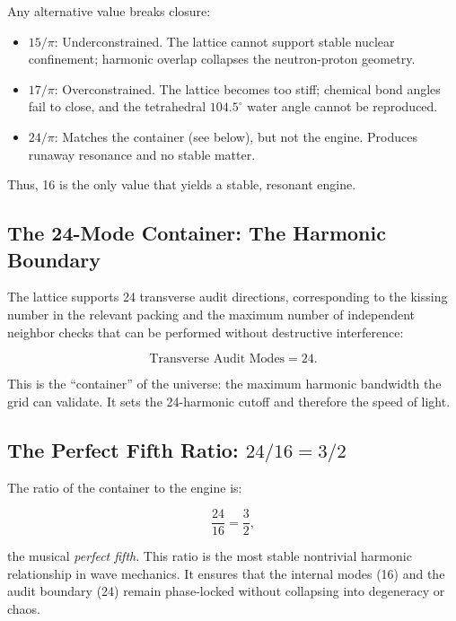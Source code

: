 \documentclass[12pt,oneside]{book}
\begin{document}
Any alternative value breaks closure:

\begin{itemize}
    \item \(15/\pi\): Underconstrained. The lattice cannot support stable nuclear
    confinement; harmonic overlap collapses the neutron-proton geometry.

    \item \(17/\pi\): Overconstrained. The lattice becomes too stiff; chemical bond
    angles fail to close, and the tetrahedral \(104.5^\circ\) water angle cannot be
    reproduced.

    \item \(24/\pi\): Matches the container (see below), but not the engine. Produces
    runaway resonance and no stable matter.
\end{itemize}

Thus, 16 is the only value that yields a stable, resonant engine.

\subsection{The 24-Mode Container: The Harmonic Boundary}

The lattice supports 24 transverse audit directions, corresponding to the kissing number
in the relevant packing and the maximum number of independent neighbor checks that
can be performed without destructive interference:



\[
\text{Transverse Audit Modes} = 24.
\]



This is the ``container'' of the universe: the maximum harmonic bandwidth the grid can
validate. It sets the 24-harmonic cutoff and therefore the speed of light.

\subsection{The Perfect Fifth Ratio: \(24/16 = 3/2\)}

The ratio of the container to the engine is:



\[
\frac{24}{16} = \frac{3}{2},
\]



the musical \emph{perfect fifth}. This ratio is the most stable nontrivial harmonic
relationship in wave mechanics. It ensures that the internal modes (16) and the audit
boundary (24) remain phase-locked without collapsing into degeneracy or chaos.
\end{document}
